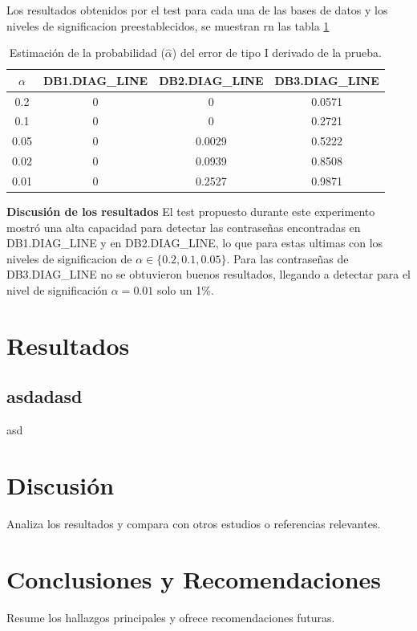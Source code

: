 \documentclass[12pt]{report}
\begin{document}
Los resultados obtenidos por el test  para cada una de las bases de datos y los  niveles de significacion preestablecidos, se muestran rn las tabla \ref{tab:error2-prob}

\begin{table}[h!]
	\centering
	\begin{tabular}{|c|ccc|}
		\hline
		 $\alpha$& DB1.DIAG\_LINE & DB2.DIAG\_LINE & DB3.DIAG\_LINE  \\
		\hline
		0.2 & 0     & 0          & 0.0571     \\
		0.1 & 0     & 0          & 0.2721     \\
		0.05 & 0     & 0.0029    & 0.5222     \\
		0.02 & 0     & 0.0939    & 0.8508     \\
		0.01 & 0     & 0.2527    & 0.9871     \\
		\hline
	\end{tabular}
	\caption{Estimación de la probabilidad ($\hat{\alpha}$) del error de tipo I derivado de la prueba.}
	\label{tab:error2-prob}
\end{table}
\textbf{Discusión de los resultados} 
El test propuesto durante este experimento mostró una alta capacidad para detectar las contraseñas encontradas en DB1.DIAG\_LINE y en DB2.DIAG\_LINE, lo que para estas ultimas con los niveles de significacion de $\alpha \in \{0.2, 0.1, 0.05\}$. Para las contraseñas de DB3.DIAG\_LINE no se obtuvieron buenos resultados, llegando a detectar para el nivel de significación $\alpha=0.01$ solo un 1\%.


\chapter{Resultados}
\section{asdadasd}
asd

\chapter{Discusión}
Analiza los resultados y compara con otros estudios o referencias relevantes.

\chapter{Conclusiones y Recomendaciones}
Resume los hallazgos principales y ofrece recomendaciones futuras.
\end{document}
